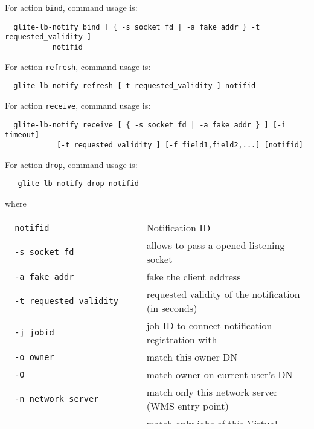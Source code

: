 For action \verb'bind', command usage is:
\begin{verbatim}
  glite-lb-notify bind [ { -s socket_fd | -a fake_addr } -t requested_validity ] 
           notifid
\end{verbatim}

For action \verb'refresh', command usage is:
\begin{verbatim}
  glite-lb-notify refresh [-t requested_validity ] notifid
\end{verbatim}

For action \verb'receive', command usage is:
\begin{verbatim}
  glite-lb-notify receive [ { -s socket_fd | -a fake_addr } ] [-i timeout]
            [-t requested_validity ] [-f field1,field2,...] [notifid]
\end{verbatim}

For action \verb'drop', command usage is:
\begin{verbatim}
   glite-lb-notify drop notifid
\end{verbatim}

where

\begin{tabularx}{\textwidth}{lX}
\texttt{  notifid} & Notification ID \\
\texttt{  -s socket\_fd} &  allows  to  pass  a opened listening socket  \\
\texttt{  -a fake\_addr} &  fake the client address \\
\texttt{  -t requested\_validity} & requested validity of the notification (in seconds)   \\
\texttt{  -j jobid} & job ID to connect notification registration with   \\
\texttt{  -o owner} & match this owner DN   \\
\texttt{  -O} & match owner on current user's DN \\
\texttt{  -n network\_server} &  match only this network server (WMS entry point)  \\
\texttt{  -v virtual\_organization} & match only jobs of this Virtual Organization  \\
\texttt{  -i timeout} & timeout to receive operation in seconds   \\
\texttt{  -f field1,field2,...} & list of status fields to print (only owner by default)   \\
\texttt{  -c} & notify only on job state change \\
\texttt{  -S, --state state1,state2,...} & match on events resulting in listed states   \\
\end{tabularx}

